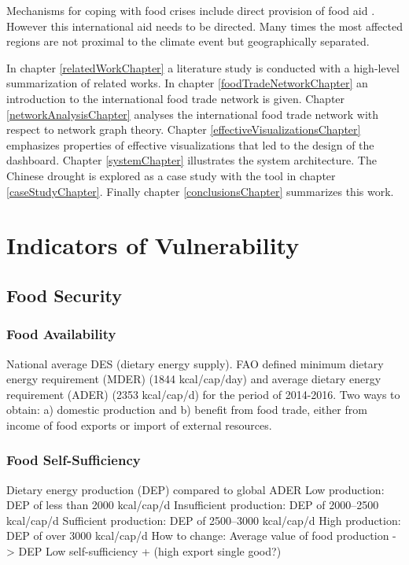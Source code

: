 	Mechanisms for coping with food crises include direct provision of food aid \citep{timmer2010reflections}. However this international aid needs to be directed. Many times the most affected regions are not proximal to the climate event but geographically separated.\par


In chapter \ref{relatedWorkChapter} a literature study is conducted with a high-level summarization of related works. In chapter \ref{foodTradeNetworkChapter} an introduction to the international food trade network is given. Chapter \ref{networkAnalysisChapter} analyses the international food trade network with respect to network graph theory. Chapter \ref{effectiveVisualizationsChapter} emphasizes properties of effective visualizations that led to the design of the dashboard. Chapter \ref{systemChapter} illustrates the system architecture. The Chinese drought is explored as a case study with the tool in chapter \ref{caseStudyChapter}. Finally chapter \ref{conclusionsChapter} summarizes this work.

\section{Indicators of Vulnerability}

\subsection{Food Security}
\subsubsection{Food Availability}
National average DES (dietary energy supply). FAO defined minimum dietary energy requirement (MDER) (1844 kcal/cap/day) and average dietary energy requirement (ADER) (2353 kcal/cap/d) for the period of 2014-2016.
Two ways to obtain: a) domestic production and b) benefit from food trade, either from income of food exports or import of external resources. \cite{porkka2013food}
\subsubsection{Food Self-Sufficiency}
Dietary energy production (DEP) compared to global ADER
Low production: DEP of less than 2000 kcal/cap/d
Insufficient production: DEP of 2000–2500 kcal/cap/d
Sufficient production: DEP of 2500–3000 kcal/cap/d
High production: DEP of over 3000 kcal/cap/d \cite{porkka2013food}
How to change: Average value of food production -> DEP
Low self-sufficiency + (high export single good?)
